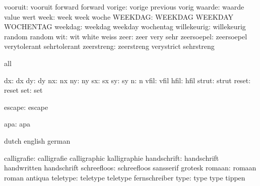             vooruit:  vooruit              forward             forward %
             vorige:  vorige               previous            vorig
             waarde:  waarde               value               wert
               week:  week                 week                woche
            WEEKDAG:  WEEKDAG              WEEKDAY             WOCHENTAG
            weekdag:  weekdag              weekday             wochentag
        willekeurig:  willekeurig          random              random %
                wit:  wit                  white               weiss
               zeer:  zeer                 very                sehr
         zeersoepel:  zeersoepel           verytolerant        sehrtolerant
         zeerstreng:  zeerstreng           verystrict          sehrstreng

\stopvariables




\startconstants       all

                 dx:  dx
                 dy:  dy
                 nx:  nx
                 ny:  ny
                 sx:  sx
                 sy:  sy
                  n:  n
               vfil:  vfil
               hfil:  hfil
              strut:  strut
              reset:  reset
                set:  set

             escape:  escape

                apa:  apa

\stopconstants




\startconstants       dutch                english             german

        calligrafie:  calligrafie          calligraphic        kalligraphie
        handschrift:  handschrift          handwritten         handschrift
        schreefloos:  schreefloos          sansserif           grotesk
             romaan:  romaan               roman               antiqua
           teletype:  teletype             teletype            fernschreiber
               type:  type                 type                tippen

